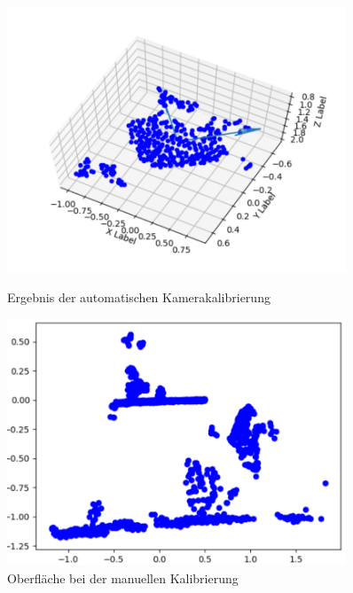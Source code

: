 \begin{figure}
    \centering
    \begin{minipage}{0.45\textwidth}
        \centering
        \includegraphics[width=0.9\textwidth]{images/table_automatic_axis_center_estimation.png}
        \caption{Ergebnis der automatischen Kamerakalibrierung \label{fig:camera_calibration}}
    \end{minipage}\hfill
    \begin{minipage}{0.45\textwidth}
        \centering
        \includegraphics[width=0.9\textwidth]{images/table_manual_calibration.png}
        \caption{Oberfläche bei der manuellen Kalibrierung \label{fig:calibration_collection}}
    \end{minipage}
\end{figure}